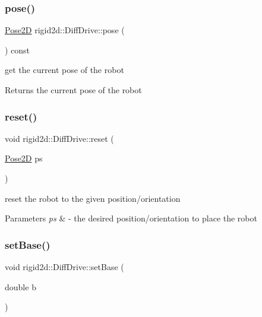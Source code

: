 \subsubsection{\texorpdfstring{pose()}{pose()}}
{\footnotesize\ttfamily \hyperlink{structrigid2d_1_1Pose2D}{Pose2D} rigid2d\+::\+Diff\+Drive\+::pose (\begin{DoxyParamCaption}{ }\end{DoxyParamCaption}) const}



get the current pose of the robot 

\begin{DoxyReturn}{Returns}
the current pose of the robot 
\end{DoxyReturn}
\mbox{\label{classrigid2d_1_1DiffDrive_afffa18508c27b368767182dba1a7d367}} 
\subsubsection{\texorpdfstring{reset()}{reset()}}
{\footnotesize\ttfamily void rigid2d\+::\+Diff\+Drive\+::reset (\begin{DoxyParamCaption}\item[{\hyperlink{structrigid2d_1_1Pose2D}{Pose2D}}]{ps }\end{DoxyParamCaption})}



reset the robot to the given position/orientation 


\begin{DoxyParams}{Parameters}
{\em ps} & -\/ the desired position/orientation to place the robot \\
\hline
\end{DoxyParams}
\mbox{\label{classrigid2d_1_1DiffDrive_aed9b82741312243d9ea1f705afc372dc}} 
\subsubsection{\texorpdfstring{set\+Base()}{setBase()}}
{\footnotesize\ttfamily void rigid2d\+::\+Diff\+Drive\+::set\+Base (\begin{DoxyParamCaption}\item[{double}]{b }\end{DoxyParamCaption})}



